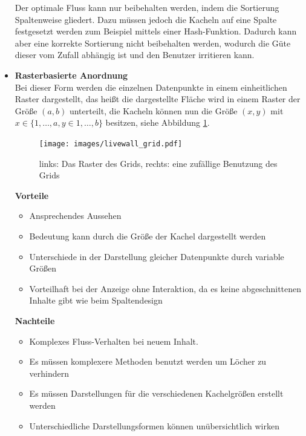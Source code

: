 \documentclass[12pt,twoside]{book}
\begin{document}
\begin{itemize}
Der optimale Fluss kann nur beibehalten werden, indem die Sortierung Spaltenweise gliedert. Dazu müssen jedoch die Kacheln auf eine Spalte festgesetzt werden zum Beispiel mittels einer Hash-Funktion. Dadurch kann aber eine korrekte Sortierung nicht beibehalten werden, wodurch die Güte dieser vom Zufall abhängig ist und den Benutzer irritieren kann.

  \item \textbf{Rasterbasierte Anordnung} \\
  Bei dieser Form werden die einzelnen Datenpunkte in einem einheitlichen Raster dargestellt, das heißt die dargestellte Fläche wird in einem Raster der Größe $(a, b)$ unterteilt, die Kacheln können nun die Größe $(x, y)$ mit $ x \in \{1, \dots, a, y \in 1, \dots, b\}$ besitzen, siehe Abbildung \ref{fig:raster}.

  \begin{figure}[htbp]
    \centering
    \texttt{[image: images/livewall\_grid.pdf]}
    \caption{links: Das Raster des Grids, rechts: eine zufällige Benutzung des Grids}
    \label{fig:raster}
  \end{figure}

  \textbf{Vorteile} \\
  \begin{itemize}
    \item Ansprechendes Aussehen
    \item Bedeutung kann durch die Größe der Kachel dargestellt werden
    \item Unterschiede in der Darstellung gleicher Datenpunkte durch variable Größen
    \item Vorteilhaft bei der Anzeige ohne Interaktion, da es keine abgeschnittenen Inhalte gibt wie beim Spaltendesign
  \end{itemize}

  \textbf{Nachteile}\\
  \begin{itemize}
    \item Komplexes Fluss-Verhalten bei neuem Inhalt.
    \item Es müssen komplexere Methoden benutzt werden um Löcher zu verhindern
    \item Es müssen Darstellungen für die verschiedenen Kachelgrößen erstellt werden
    \item Unterschiedliche Darstellungsformen können unübersichtlich wirken
  \end{itemize}

\end{itemize}
\end{document}
